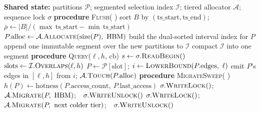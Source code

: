 \documentclass[10pt]{article}
\theoremstyle{definition}
\begin{document}
\begin{algorithm}[t]
\caption{Philemon-TSH ingest, query, and background migration}
\label{alg:philemon}
\begin{algorithmic}[1]
\STATE \textbf{Shared state:} partitions $\mathcal{P}$; segmented selection index $\mathcal{I}$; tiered allocator $\mathcal{A}$; sequence lock $\sigma$
\STATE
\STATE \textbf{procedure} \textsc{Flush}( ) 
\STATE \quad sort $B$ by $(\mathrm{ts\_start},\mathrm{ts\_end})$; \quad $\bar\rho \gets |B| / (\max\,\mathrm{ts\_start} - \min\,\mathrm{ts\_start})$
  \STATE $P.\mathrm{alloc} \gets \mathcal{A}.\textsc{Allocate}(\mathrm{size}(P),\ \mathrm{HBM})$ 
  \STATE build the dual-sorted interval index for $P$ 
\ENDFOR
\STATE append one immutable segment over the new partitions to $\mathcal{I}$ 
  \STATE compact $\mathcal{I}$ into one segment
\ENDIF
\STATE
\STATE \textbf{procedure} \textsc{Query}($\ell,h$, cb)
\REPEAT
  \STATE $s \gets \sigma.\textsc{ReadBegin}()$ 
  \STATE $\mathrm{slots} \gets \mathcal{I}.\textsc{Overlaps}(\ell,h)$ 
    \STATE $P \gets \mathcal{P}[\mathrm{slot}]$; \quad $i \gets \textsc{LowerBound}(P.\mathrm{edges},\ \ell)$ 
    \STATE emit $P$'s edges in $[\ell,h]$ from $i$; \quad $\mathcal{A}.\textsc{Touch}(P.\mathrm{alloc})$ 
  \ENDFOR
{} 
\STATE
\STATE \textbf{procedure} \textsc{MigrateSweep}( ) 
  \STATE $h(P) \gets \mathrm{hotness}(P.\mathrm{access\_count},\ P.\mathrm{last\_access})$
    \STATE $\sigma.\textsc{WriteLock}()$;\ \ $\mathcal{A}.\textsc{Migrate}(P,\ \mathrm{HBM})$;\ \ $\sigma.\textsc{WriteUnlock}()$
    \STATE $\sigma.\textsc{WriteLock}()$;\ \ $\mathcal{A}.\textsc{Migrate}(P,\ \text{next colder tier})$;\ \ $\sigma.\textsc{WriteUnlock}()$
  \ENDIF
\ENDFOR
\end{algorithmic}
\end{algorithm}
\end{document}
